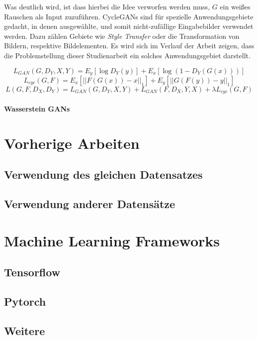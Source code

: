 Was deutlich wird, ist dass hierbei die Idee verworfen werden muss, $G$ ein weißes Rauschen als Input zuzuführen. \acp{CycleGAN} sind für spezielle Anwendungsgebiete gedacht, in denen ausgewählte, und somit nicht-zufällige Eingabebilder verwendet werden. Dazu zählen Gebiete wie \emph{Style Transfer} oder die Transformation von Bildern, respektive Bildelementen. Es wird sich im Verlauf der Arbeit zeigen, dass die Problemstellung dieser Studienarbeit ein solches Anwendungsgebiet darstellt.

\begin{equation}
	L_{GAN}(G, D_Y, X, Y) = E_y[\log{D_Y(y)}] + E_x[\log(1-D_Y(G(x)))]
\end{equation}
\begin{equation}
	L_{cyc}(G, F) = E_x[||F(G(x))-x||_1] + E_y[||G(F(y))-y||_1]
\end{equation}
\begin{equation}
	L(G, F, D_X, D_Y) = L_{GAN}(G, D_Y, X, Y) + L_{GAN}(F, D_X, Y, X) + \lambda L_{cyc}(G, F)
\end{equation}
\cite{cycleGAN}
\paragraph{Wasserstein GANs}

\cite{Goodfellow-et-al-2016}
\cite{visualApproach}
\section{Vorherige Arbeiten}
\subsection{Verwendung des gleichen Datensatzes}
\cite{gtsrbGAN}
\subsection{Verwendung anderer Datensätze}
\cite{taiwanGAN}

\section{Machine Learning Frameworks}
\subsection{Tensorflow}
\subsection{Pytorch}
\subsection{Weitere}